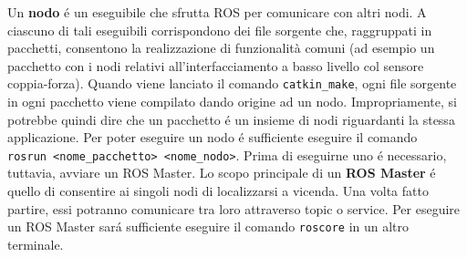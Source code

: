 Un \textbf{nodo} \'{e} un eseguibile che sfrutta ROS per comunicare con altri nodi. 
A ciascuno di tali eseguibili corrispondono dei file sorgente che, raggruppati in pacchetti, consentono la realizzazione di 
funzionalità comuni (ad esempio un pacchetto con i nodi relativi all'interfacciamento a basso livello col sensore coppia-forza).
Quando viene lanciato il comando \verb|catkin_make|, ogni file sorgente in ogni pacchetto viene compilato 
dando origine ad un nodo.
Impropriamente, si potrebbe quindi dire che un pacchetto \'{e} un insieme di nodi riguardanti la stessa applicazione.
Per poter eseguire un nodo \'{e} sufficiente eseguire il comando \\
\verb|rosrun <nome_pacchetto> <nome_nodo>|. 
Prima di eseguirne uno \'{e} necessario, tuttavia, avviare un ROS Master.
Lo scopo principale di un \textbf{ROS Master} \'{e} quello di consentire ai singoli nodi di localizzarsi a vicenda. Una volta 
fatto partire, essi potranno comunicare tra loro attraverso topic o service.
Per eseguire un ROS Master sar\'{a} sufficiente eseguire il comando \verb|roscore| in un altro terminale.
